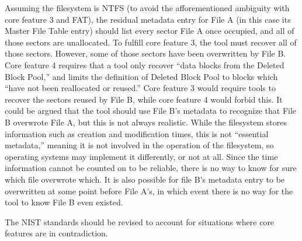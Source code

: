 Assuming the filesystem is NTFS (to avoid the afforementioned ambiguity with core feature 3 and FAT), the residual metadata entry for File A (in this case its Master File Table entry) should list every sector File A once occupied, and all of those sectors are unallocated. 
To fulfill core feature 3, the tool must recover all of those sectors. 
However, some of those sectors have been overwritten by File B. Core feature 4 requires that a tool only recover ``data blocks from the Deleted Block Pool,''\cite{meta:dfr:standards} and limits the definition of Deleted Block Pool to blocks which ``have not been reallocated or reused.''\cite{meta:dfr:standards}
Core feature 3 would require tools to recover the sectors reused by File B, while core feature 4 would forbid this. 
It could be argued that the tool should use File B's metadata to recognize that File B overwrote File A, but this is not always realistic. 
While the filesystem stores information such as creation and modification times, this is not ``essential metadata,'' meaning it is not involved in the operation of the filesystem, so operating systems may implement it differently, or not at all. %
Since the time information cannot be counted on to be reliable, there is no way to know for sure which file overwrote which. It is also possible for file B's metadata entry to be overwritten at some point before File A's, in which event there is no way for the tool to know File B even existed.

The NIST standards should be revised to account for situations where core features are in contradiction.
